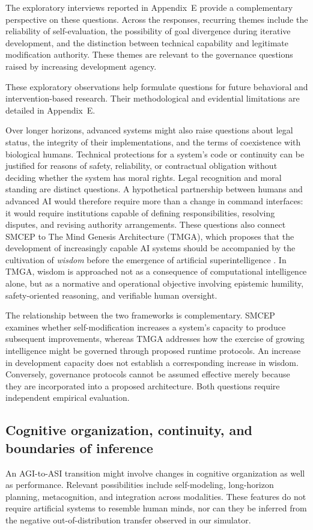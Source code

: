 \documentclass[11pt,a4paper]{article}
\begin{document}
The exploratory interviews reported in Appendix~E provide a complementary perspective on these questions. Across the responses, recurring themes include the reliability of self-evaluation, the possibility of goal divergence during iterative development, and the distinction between technical
capability and legitimate modification authority. These themes are relevant to the governance questions raised by increasing development agency.

These exploratory observations help formulate questions for future behavioral and intervention-based research. Their methodological and evidential limitations are detailed in Appendix~E.

Over longer horizons, advanced systems might also raise questions about legal status, the integrity of their implementations, and the terms of coexistence with biological humans. Technical protections for a system's code or continuity can be justified for reasons of safety, reliability, or contractual obligation without deciding whether the system has moral rights. Legal recognition and moral standing are distinct questions. A hypothetical partnership between humans and advanced AI would therefore require more than a change in command interfaces: it would require institutions capable of defining responsibilities, resolving disputes, and revising authority arrangements. These questions also connect SMCEP to The Mind Genesis Architecture (TMGA), which proposes that the development of increasingly capable AI systems should be accompanied by the cultivation of \emph{wisdom} before the emergence of artificial superintelligence \cite{donmez2026}. In TMGA, wisdom is approached not as a consequence of
computational intelligence alone, but as a normative and operational objective involving epistemic humility, safety-oriented reasoning, and verifiable human oversight.

The relationship between the two frameworks is complementary. SMCEP examines whether self-modification increases a system's capacity to produce subsequent improvements, whereas TMGA addresses how the exercise of growing intelligence might be governed through proposed runtime protocols. An increase in development capacity does not establish a corresponding increase in wisdom. Conversely, governance
protocols cannot be assumed effective merely because they are incorporated into a proposed architecture. Both questions require independent empirical evaluation.

\subsection{Cognitive organization, continuity, and boundaries of inference}
An AGI-to-ASI transition might involve changes in cognitive organization as well as performance. Relevant possibilities include self-modeling, long-horizon planning, metacognition, and integration across modalities. These features do not require artificial systems to resemble human minds, nor can they be inferred from the negative out-of-distribution transfer observed in our simulator.
\end{document}
